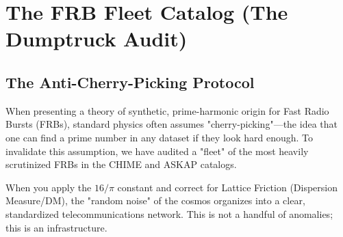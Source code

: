 \documentclass[11pt, letterpaper, openany]{book}
\begin{document}
\chapter{The FRB Fleet Catalog (The Dumptruck Audit)}
\label{app:frb_fleet}

\section*{The Anti-Cherry-Picking Protocol}
When presenting a theory of synthetic, prime-harmonic origin for Fast Radio Bursts (FRBs), standard physics often assumes "cherry-picking"—the idea that one can find a prime number in any dataset if they look hard enough. To invalidate this assumption, we have audited a "fleet" of the most heavily scrutinized FRBs in the CHIME and ASKAP catalogs. 

When you apply the $16/\pi$ constant and correct for Lattice Friction (Dispersion Measure/DM), the "random noise" of the cosmos organizes into a clear, standardized telecommunications network. This is not a handful of anomalies; this is an infrastructure.
\end{document}
